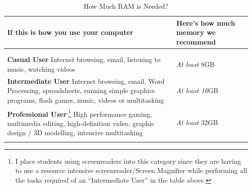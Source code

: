 \documentclass[14pt,letterpaper,twoside]{extreport}
\newcommand\fnsep{\textsuperscript{,}}
\begin{document}
\begin{longtable}[]{@{}>{\raggedright\arraybackslash}m{}>{\raggedright\arraybackslash}b{}@{}}
	\toprule

	\textbf{If this is how you use your computer}                                                                                                                                                                                                                                                                                                                                                         & \textbf{Here's how much memory we recommend} \\
	\midrule
	\endhead \hline                                                                                                                                                                                                                                                                                                                                                                                                                                      \\
	\multicolumn{2}{r}{\textbf{Continued on Next Page}}                                                                                                                                                                                                                                                                                                                                                                                                  \\
	\endfoot

	\endlastfoot
	\textbf{Casual User} \break Internet browsing, email, listening to music, watching videos                                                                                                                                                                                                                                                                                                             & \emph{At least} 8GB                          \\[1.5em]
	\textbf{Intermediate User} \break Internet browsing, email, Word Processing, spreadsheets, running simple graphics programs, flash games, music, videos or multitasking                                                                                                                                                                                                                               & \emph{At least 16}GB                        \\[1.5em]
	\textbf{Professional User}\fnsep\footnote{I place students using screenreaders into this category since they are having to use a resource intensive screenreader/Screen Magnifier while performing all the tasks required of an ``Intermediate User'' in the table above.} \break High performance gaming, multimedia editing, high-definition video, graphic design / 3D modelling, intensive multitasking & \emph{At least} 32GB                         \\[1.5em] \hline
	\caption{How Much RAM is Needed?}
\end{longtable}
\end{document}
